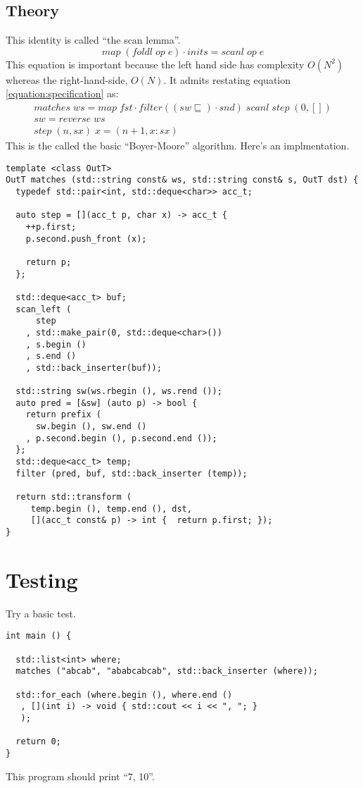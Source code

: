 \documentclass{article}
\begin{document}
\subsection{Theory}
This identity is called ``the scan lemma''.
\begin{equation}
map\;(foldl\;op\;e) \cdot inits = scanl\;op\;e
\end{equation}
This equation is important because the left hand side has complexity
\(O(N^{2})\) whereas the right-hand-side, \(O(N)\). It admits
restating equation \ref{equation:specification} as:
\begin{gather}
matches\;ws = map\;fst \cdot filter ((sw \sqsubseteq) \cdot snd)\;scanl\; step\;(0, []) \nonumber\\
sw = reverse\;ws \nonumber\\
step\;(n, sx)\;x = (n + 1, x:sx)
\end{gather}
This is the called the basic ``Boyer-Moore'' algorithm. Here's an implmentation.
\begin{verbatim}
template <class OutT>
OutT matches (std::string const& ws, std::string const& s, OutT dst) {
  typedef std::pair<int, std::deque<char>> acc_t;

  auto step = [](acc_t p, char x) -> acc_t {
    ++p.first;
    p.second.push_front (x);

    return p;
  };

  std::deque<acc_t> buf;
  scan_left (
      step
    , std::make_pair(0, std::deque<char>())
    , s.begin ()
    , s.end ()
    , std::back_inserter(buf));

  std::string sw(ws.rbegin (), ws.rend ());
  auto pred = [&sw] (auto p) -> bool { 
    return prefix (
      sw.begin (), sw.end ()
    , p.second.begin (), p.second.end ()); 
  };
  std::deque<acc_t> temp;
  filter (pred, buf, std::back_inserter (temp));

  return std::transform (
     temp.begin (), temp.end (), dst, 
     [](acc_t const& p) -> int {  return p.first; });
}
\end{verbatim}
\section{Testing}
Try a basic test.
\begin{verbatim}
int main () {

  std::list<int> where;
  matches ("abcab", "ababcabcab", std::back_inserter (where));

  std::for_each (where.begin (), where.end ()
   , [](int i) -> void { std::cout << i << ", "; }
   );  

  return 0;
}
\end{verbatim}
This program should print ``7, 10''.
\end{document}
